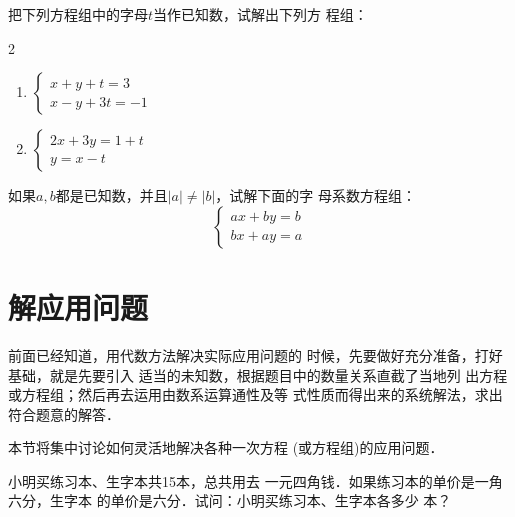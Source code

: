 \begin{enumerate}
\staritem 把下列方程组中的字母$t$当作已知数，试解出下列方
程组：
\begin{multicols}{2}
    \begin{enumerate}
\item $\begin{cases}
    x+y+t=3\\ x-y+3t=-1
\end{cases}$
\item $\begin{cases}
    2x+3y=1+t\\ y=x-t
\end{cases}$
\end{enumerate}
\end{multicols}

\staritem 如果$a,b$都是已知数，并且$|a|\ne |b|$，试解下面的字
母系数方程组：
\[\begin{cases}
    ax+by=b\\ bx+ay=a
\end{cases} \]
\end{enumerate}


\section{解应用问题}
    前面已经知道，用代数方法解决实际应用问题的
时候，先要做好充分准备，打好基础，就是先要引入
适当的未知数，根据题目中的数量关系直截了当地列
出方程或方程组；然后再去运用由数系运算通性及等
式性质而得出来的系统解法，求出符合题意的解答．

    本节将集中讨论如何灵活地解决各种一次方程
  (或方程组)的应用问题．

    
\begin{example}
    小明买练习本、生字本共15本，总共用去
一元四角钱．如果练习本的单价是一角六分，生字本
的单价是六分．试问：小明买练习本、生字本各多少
本？
\end{example}

